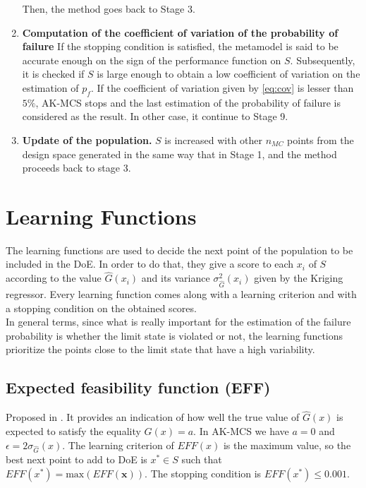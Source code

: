 \begin{enumerate}
    Then, the method goes back to Stage 3.
    \item \textbf{Computation of the coefficient of variation of the probability of
    failure} If the stopping condition is satisfied, the metamodel is said to be
    accurate enough on the sign of the performance function on $S$. Subsequently,
    it is checked if $S$ is large enough to obtain a low coefficient of variation
    on the estimation of $p_f$. If the coefficient of variation given by \ref{eq:cov} is lesser than
    $5\%$, AK-MCS stops and the last estimation of the probability of failure is
    considered as the result. In other case, it continue to Stage 9.
    \item \textbf{Update of the population.} $S$ is increased with other $n_{MC}$ points from the
    design space generated in the same way that in Stage 1, and the method proceeds back to stage 3.
\end{enumerate} 

\section{Learning Functions}
The learning functions are used to decide the next point of the population to be
included in the DoE. In order to do that, they give a score to each $x_i$ of $S$
according to the value $\widehat{G}(x_i)$ and its variance $\sigma^2_{\widehat{G}}(x_i)$
given by the Kriging regressor. Every learning function comes along with a learning criterion
and with a stopping condition on the obtained scores. \\

In general terms, since what is really important for the estimation of the failure probability is whether the limit state is violated or not, the learning functions prioritize the points close to the limit state that have a high variability.

\subsection{Expected feasibility function (EFF)}

Proposed in \citep{Bichon2008}. It provides an indication of how well the true value
of $\widehat{G}(x)$ is expected to satisfy the equality $G(x) = a$. In AK-MCS we have
$a = 0$ and $\epsilon = 2 \sigma_{\widehat{G}}(x)$. The learning criterion of $EFF(x)$
is the maximum value, so the best next point to add to DoE is $x^* \in S$ such that
$EFF(x^*) =\text{max}(EFF(\bm{x}))$. The stopping condition is $EFF(x^*) \leq 0.001$. \\

